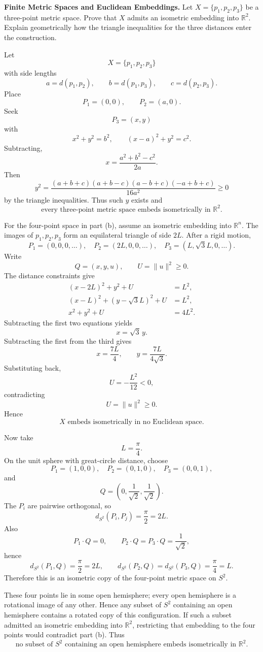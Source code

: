 \begin{problem}[CP-II-0333]
\label{prob:cp-ii-0333}
\textbf{Finite Metric Spaces and Euclidean Embeddings.}
Let \(X=\{p_1,p_2,p_3\}\) be a three-point metric space. Prove that \(X\)
admits an isometric embedding into \(\mathbb R^2\). Explain geometrically how
the triangle inequalities for the three distances enter the construction.
\end{problem}

\begin{solution}
Let
\[
X=\{p_1,p_2,p_3\}
\]
with side lengths
\[
a=d(p_1,p_2),\qquad
b=d(p_1,p_3),\qquad
c=d(p_2,p_3).
\]
Place
\[
P_1=(0,0),
\qquad
P_2=(a,0).
\]
Seek
\[
P_3=(x,y)
\]
with
\[
x^2+y^2=b^2,
\qquad
(x-a)^2+y^2=c^2.
\]
Subtracting,
\[
x=\frac{a^2+b^2-c^2}{2a}.
\]
Then
\[
y^2
=
\frac{
(a+b+c)(a+b-c)(a-b+c)(-a+b+c)
}{
16a^2
}
\ge0
\]
by the triangle inequalities. Thus such \(y\) exists and
\[
\boxed{\text{every three-point metric space embeds isometrically in }\mathbb R^2.}
\]

For the four-point space in part (b), assume an isometric embedding into \(\mathbb R^n\). The images of \(p_1,p_2,p_3\) form an equilateral triangle of side \(2L\). After a rigid motion,
\[
P_1=(0,0,0,\ldots),
\quad
P_2=(2L,0,0,\ldots),
\quad
P_3=(L,\sqrt3L,0,\ldots).
\]
Write
\[
Q=(x,y,u),
\qquad
U=\|u\|^2\ge0.
\]
The distance constraints give
\[
\begin{aligned}
(x-2L)^2+y^2+U&=L^2,\\
(x-L)^2+(y-\sqrt3L)^2+U&=L^2,\\
x^2+y^2+U&=4L^2.
\end{aligned}
\]
Subtracting the first two equations yields
\[
x=\sqrt3\,y.
\]
Subtracting the first from the third gives
\[
x=\frac{7L}{4},
\qquad
y=\frac{7L}{4\sqrt3}.
\]
Substituting back,
\[
U
=
-\frac{L^2}{12}<0,
\]
contradicting
\[
U=\|u\|^2\ge0.
\]
Hence
\[
\boxed{X\text{ embeds isometrically in no Euclidean space}.}
\]

Now take
\[
L=\frac{\pi}{4}.
\]
On the unit sphere with great-circle distance, choose
\[
P_1=(1,0,0),
\quad
P_2=(0,1,0),
\quad
P_3=(0,0,1),
\]
and
\[
Q=
\left(
0,\frac1{\sqrt2},\frac1{\sqrt2}
\right).
\]
The \(P_i\) are pairwise orthogonal, so
\[
d_{S^2}(P_i,P_j)=\frac{\pi}{2}=2L.
\]
Also
\[
P_1\cdot Q=0,
\qquad
P_2\cdot Q=P_3\cdot Q=\frac1{\sqrt2},
\]
hence
\[
d_{S^2}(P_1,Q)=\frac{\pi}{2}=2L,
\qquad
d_{S^2}(P_2,Q)
=
d_{S^2}(P_3,Q)
=
\frac{\pi}{4}=L.
\]
Therefore this is an isometric copy of the four-point metric space on \(S^2\).

These four points lie in some open hemisphere; every open hemisphere is a rotational image of any other. Hence any subset of \(S^2\) containing an open hemisphere contains a rotated copy of this configuration. If such a subset admitted an isometric embedding into \(\mathbb R^2\), restricting that embedding to the four points would contradict part (b). Thus
\[
\boxed{
\text{no subset of }S^2\text{ containing an open hemisphere embeds isometrically in }\mathbb R^2.
}
\]
\end{solution}


